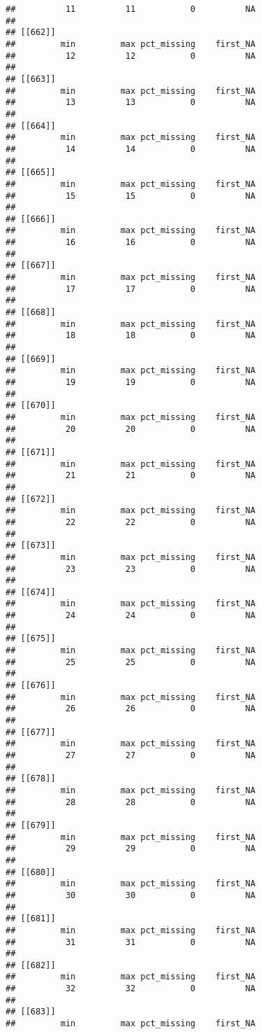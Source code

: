 \documentclass[
]{article}
\begin{document}
\begin{verbatim}
##          11          11           0          NA 
## 
## [[662]]
##         min         max pct_missing    first_NA 
##          12          12           0          NA 
## 
## [[663]]
##         min         max pct_missing    first_NA 
##          13          13           0          NA 
## 
## [[664]]
##         min         max pct_missing    first_NA 
##          14          14           0          NA 
## 
## [[665]]
##         min         max pct_missing    first_NA 
##          15          15           0          NA 
## 
## [[666]]
##         min         max pct_missing    first_NA 
##          16          16           0          NA 
## 
## [[667]]
##         min         max pct_missing    first_NA 
##          17          17           0          NA 
## 
## [[668]]
##         min         max pct_missing    first_NA 
##          18          18           0          NA 
## 
## [[669]]
##         min         max pct_missing    first_NA 
##          19          19           0          NA 
## 
## [[670]]
##         min         max pct_missing    first_NA 
##          20          20           0          NA 
## 
## [[671]]
##         min         max pct_missing    first_NA 
##          21          21           0          NA 
## 
## [[672]]
##         min         max pct_missing    first_NA 
##          22          22           0          NA 
## 
## [[673]]
##         min         max pct_missing    first_NA 
##          23          23           0          NA 
## 
## [[674]]
##         min         max pct_missing    first_NA 
##          24          24           0          NA 
## 
## [[675]]
##         min         max pct_missing    first_NA 
##          25          25           0          NA 
## 
## [[676]]
##         min         max pct_missing    first_NA 
##          26          26           0          NA 
## 
## [[677]]
##         min         max pct_missing    first_NA 
##          27          27           0          NA 
## 
## [[678]]
##         min         max pct_missing    first_NA 
##          28          28           0          NA 
## 
## [[679]]
##         min         max pct_missing    first_NA 
##          29          29           0          NA 
## 
## [[680]]
##         min         max pct_missing    first_NA 
##          30          30           0          NA 
## 
## [[681]]
##         min         max pct_missing    first_NA 
##          31          31           0          NA 
## 
## [[682]]
##         min         max pct_missing    first_NA 
##          32          32           0          NA 
## 
## [[683]]
##         min         max pct_missing    first_NA 

\end{verbatim}
\end{document}
